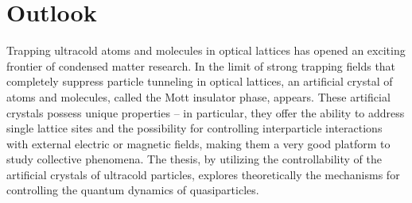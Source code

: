 \chapter{Outlook}
\label{ch:conclusion}

Trapping ultracold atoms and molecules in optical lattices has opened an exciting frontier of condensed 
matter research\cite{Baranov2012}. In the limit of strong trapping fields that completely suppress particle tunneling
in optical lattices, an artificial crystal of atoms and molecules, called the Mott insulator phase, appears. These artificial crystals possess 
unique properties -- in particular, they offer  the ability to address single lattice sites\cite{atom-mott1, atom-mott2} and the possibility for controlling interparticle interactions with external electric or magnetic fields\cite{quemener2012, Baranov2012},  making them a very good platform to
study collective phenomena\cite{our-njp-review, quemener2012, Baranov2012}. The thesis, by utilizing  the controllability of the artificial crystals of ultracold particles, explores theoretically the mechanisms for  
controlling the quantum dynamics
of quasiparticles. 

